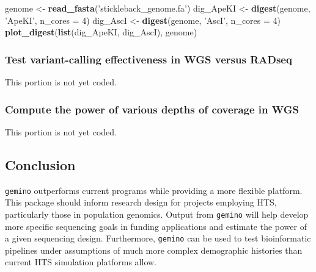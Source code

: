 \documentclass[12pt,]{article}
\newenvironment{Shaded}{\begin{snugshade}}{\end{snugshade}}
\newcommand{\DataTypeTok}[1]{\textcolor[rgb]{0.13,0.29,0.53}{#1}}
\newcommand{\DecValTok}[1]{\textcolor[rgb]{0.00,0.00,0.81}{#1}}
\newcommand{\KeywordTok}[1]{\textcolor[rgb]{0.13,0.29,0.53}{\textbf{#1}}}
\newcommand{\NormalTok}[1]{#1}
\newcommand{\StringTok}[1]{\textcolor[rgb]{0.31,0.60,0.02}{#1}}
\begin{document}
\begin{Shaded}
\begin{Highlighting}[]
\NormalTok{genome <-}\StringTok{ }\KeywordTok{read_fasta}\NormalTok{(}\StringTok{'stickleback_genome.fa'}\NormalTok{)}
\NormalTok{dig_ApeKI <-}\StringTok{ }\KeywordTok{digest}\NormalTok{(genome, }\StringTok{'ApeKI'}\NormalTok{, }\DataTypeTok{n_cores =} \DecValTok{4}\NormalTok{)}
\NormalTok{dig_AscI <-}\StringTok{ }\KeywordTok{digest}\NormalTok{(genome, }\StringTok{'AscI'}\NormalTok{, }\DataTypeTok{n_cores =} \DecValTok{4}\NormalTok{)}
\KeywordTok{plot_digest}\NormalTok{(}\KeywordTok{list}\NormalTok{(dig_ApeKI, dig_AscI), genome)}
\end{Highlighting}
\end{Shaded}

\hypertarget{test-variant-calling-effectiveness-in-wgs-versus-radseq}{%
\subsubsection{Test variant-calling effectiveness in WGS versus
RADseq}\label{test-variant-calling-effectiveness-in-wgs-versus-radseq}}

This portion is not yet coded.

\hypertarget{compute-the-power-of-various-depths-of-coverage-in-wgs}{%
\subsubsection{Compute the power of various depths of coverage in
WGS}\label{compute-the-power-of-various-depths-of-coverage-in-wgs}}

This portion is not yet coded.

\hypertarget{conclusion}{%
\subsection{Conclusion}\label{conclusion}}

\texttt{gemino} outperforms current programs while providing a more
flexible platform. This package should inform research design for
projects employing HTS, particularly those in population genomics.
Output from \texttt{gemino} will help develop more specific sequencing
goals in funding applications and estimate the power of a given
sequencing design. Furthermore, \texttt{gemino} can be used to test
bioinformatic pipelines under assumptions of much more complex
demographic histories than current HTS simulation platforms allow.
\end{document}
